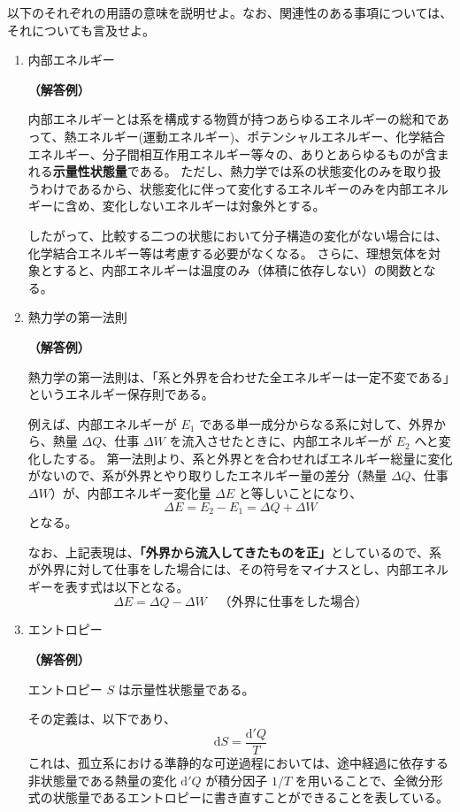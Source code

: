 \documentclass[uplatex,dvipdfmx,a4paper,11pt]{jsarticle}
\newcommand{\diff}{\mathrm d}
\begin{document}
\begin{appendix}
\begin{enumerate}
以下のそれぞれの用語の意味を説明せよ。なお、関連性のある事項については、それについても言及せよ。

\begin{enumerate}

\item
内部エネルギー

{\bf （解答例）} 

内部エネルギーとは系を構成する物質が持つあらゆるエネルギーの総和であって、熱エネルギー(運動エネルギー)、ポテンシャルエネルギー、化学結合エネルギー、分子間相互作用エネルギー等々の、ありとあらゆるものが含まれる{\bf 示量性状態量}である。
ただし、熱力学では系の状態変化のみを取り扱うわけであるから、状態変化に伴って変化するエネルギーのみを内部エネルギーに含め、変化しないエネルギーは対象外とする。

したがって、比較する二つの状態において分子構造の変化がない場合には、化学結合エネルギー等は考慮する必要がなくなる。
さらに、理想気体を対象とすると、内部エネルギーは温度のみ（体積に依存しない）の関数となる。

\item
熱力学の第一法則

{\bf （解答例）} 

熱力学の第一法則は、「系と外界を合わせた全エネルギーは一定不変である」というエネルギー保存則である。

例えば、内部エネルギーが $E_1$ である単一成分からなる系に対して、外界から、熱量 $\Delta Q$、仕事 $\Delta W$ を流入させたときに、内部エネルギーが $E_2$ へと変化したする。
第一法則より、系と外界とを合わせればエネルギー総量に変化がないので、系が外界とやり取りしたエネルギー量の差分（熱量 $\Delta Q$、仕事 $\Delta W$）が、内部エネルギー変化量 $\Delta E$ と等しいことになり、
\begin{equation*}
\Delta E = E_2 -E_1 = \Delta Q + \Delta W
\end{equation*}
となる。

なお、上記表現は、{\bf 「外界から流入してきたものを正」}としているので、系が外界に対して仕事をした場合には、その符号をマイナスとし、内部エネルギーを表す式は以下となる。
\begin{equation*}
\Delta E = \Delta Q - \Delta W \quad \text{（外界に仕事をした場合）}
\end{equation*}

\item
エントロピー

{\bf （解答例）} 

エントロピー $S$ は示量性状態量である。

その定義は、以下であり、
\begin{equation*}
\diff S = \dfrac{\diff' Q}{T}
\end{equation*}
これは、孤立系における準静的な可逆過程においては、途中経過に依存する非状態量である熱量の変化 $\diff' Q$ が積分因子 $1/T$ を用いることで、全微分形式の状態量であるエントロピーに書き直すことができることを表している。


\end{enumerate}
\end{enumerate}
\end{appendix}
\end{document}
